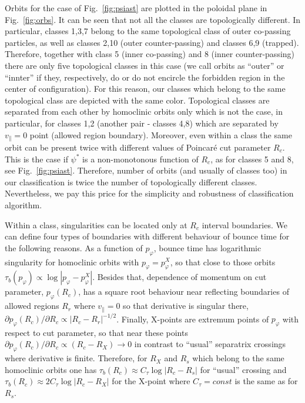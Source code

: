 \documentclass[preprint,prb,aps]{revtex4-1}
\begin{document}
Orbits for the case of Fig.~\ref{fig:psiast} are plotted in the poloidal 
plane in Fig.~\ref{fig:orbs}. It can be
seen that not all the classes are topologically different. In particular,
classes 1,3,7 belong to the same topological class of outer co-passing particles, 
as well as classes 2,10 (outer counter-passing) and classes 6,9 (trapped).
Therefore, together with class 5 (inner co-passing) and 8 (inner counter-passing)
there are only five topological classes in this case (we call orbits as
``outer'' or ``innter'' if they, respectively, 
do or do not encircle the forbidden region
in the center of configuration). 
For this reason, our classes which belong to the same topological class are
depicted with the same color.  Topological classes are
separated from each other by homoclinic orbits only which is not the case, in
particular, for classes 1,2 (another pair - classes 4,8) which are separated 
by $v_\parallel=0$ point (allowed region boundary).
Moreover, even within a class the same orbit can be present twice with different
values of Poincar\'e cut parameter $R_c$. This is the case if $\psi^\ast$ is 
a non-monotonous function of $R_c$, as for classes 5 and 8, see Fig.~\ref{fig:psiast}.
Therefore, number of orbits (and usually of classes too) in our classification 
is twice the number of topologically different classes. Nevertheless, we pay this
price for the simplicity and robustness of classification algorithm.


Within a class, singularities can be located only at $R_c$ interval boundaries. 
We can 
define four types of boundaries with different behaviour of bounce time for the
following reasons. As a function of $p_\varphi$, 
bounce time has logarithmic singularity for homoclinic orbits
with $p_\varphi=p_\varphi^X$, so that close to those orbits
$\tau_b(p_\varphi) \propto \log|p_\varphi-p_\varphi^X|$.
Besides that, dependence of momentum on cut parameter, $p_\varphi(R_c)$,
has a square root behaviour near reflecting boundaries of allowed regions $R_r$
where $v_\parallel=0$ so that derivative is singular there,
$\partial p_\varphi(R_c)/\partial R_c \propto |R_c-R_r|^{-1/2}$.
Finally, X-points are extremum points of $p_\varphi$ with respect to cut parameter,
so that near these points 
$\partial p_\varphi(R_c)/\partial R_c \propto (R_c-R_X)\rightarrow 0$
in contrast to ``usual'' separatrix crossings where derivative is finite. Therefore,
for $R_X$ and $R_s$ which belong to the same homoclinic orbits one has
$\tau_b(R_c) \approx C_\tau \log|R_c-R_s|$ for ``usual'' crossing and
$\tau_b(R_c) \approx 2 C_\tau \log|R_c-R_X|$ for the X-point where $C_\tau=const$
is the same as for $R_s$.
\end{document}
